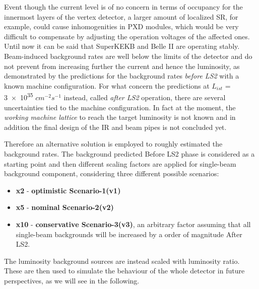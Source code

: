 \begin{comment}
\begin{figure}[h!]
\centering
\texttt{[image: bkg\_table]}
\caption{Background rate limits for Belle II detector sub-systems. The third column shows the total measured background rate in June 2021.}
\label{fig:bkg_table}
\end{figure}
\end{comment}

Event though the current level is of no concern in terms of occupancy for the innermost layers of the vertex detector, a larger amount of localized SR, for example, could cause inhomogenities in PXD modules, which would be very difficult to compensate by adjusting the operation voltages of the affected ones.\\

Until now it can be said that SuperKEKB and Belle II are operating stably. Beam-induced background rates are well below the limits of the detector and do not prevent from increasing further the current and hence the luminosity, as demonstrated by the predictions for the background rates \textit{before LS2} with a known machine configuration. 
For what concern the predictions at \textit{$L_{ist}$} = \num{3e35} $cm^{-2}s^{-1}$ instead, called \textit{after LS2} operation, there are several uncertainties tied to the machine configuration. In fact at the moment, the \emph{working machine lattice} to reach the target luminosity is not known and in addition the final design of the IR and beam pipes is not concluded yet.

Therefore an alternative solution is employed to roughly estimated the background rates. The background predicted Before LS2 phase is considered as a starting point and then different scaling factors are applied for single-beam background component, considering three different possible scenarios:

\begin{itemize}
\item \textbf{x2} - \textbf{optimistic Scenario-1(v1)}
\item \textbf{x5} - \textbf{nominal Scenario-2(v2)}
\item \textbf{x10} - \textbf{conservative Scenario-3(v3)}, an arbitrary factor assuming that all single-beam backgrounds will be increased by a order of magnitude After LS2.
\end{itemize}

The luminosity background sources are instead scaled with luminosity ratio.
These are then used to simulate the behaviour of the whole detector in future perspectives, as we will see in the following.

